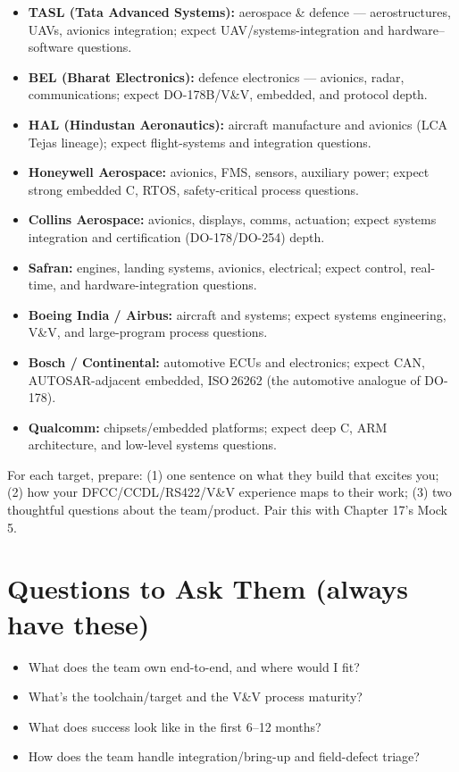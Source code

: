 \begin{itemize}
\item \textbf{TASL (Tata Advanced Systems):} aerospace \& defence --- aerostructures,
  UAVs, avionics integration; expect UAV/systems-integration and
  hardware--software questions.
\item \textbf{BEL (Bharat Electronics):} defence electronics --- avionics, radar,
  communications; expect DO-178B/V\&V, embedded, and protocol depth.
\item \textbf{HAL (Hindustan Aeronautics):} aircraft manufacture and avionics
  (LCA Tejas lineage); expect flight-systems and integration questions.
\item \textbf{Honeywell Aerospace:} avionics, FMS, sensors, auxiliary power;
  expect strong embedded C, RTOS, safety-critical process questions.
\item \textbf{Collins Aerospace:} avionics, displays, comms, actuation; expect
  systems integration and certification (DO-178/DO-254) depth.
\item \textbf{Safran:} engines, landing systems, avionics, electrical; expect
  control, real-time, and hardware-integration questions.
\item \textbf{Boeing India / Airbus:} aircraft and systems; expect systems
  engineering, V\&V, and large-program process questions.
\item \textbf{Bosch / Continental:} automotive ECUs and electronics; expect CAN,
  AUTOSAR-adjacent embedded, ISO\,26262 (the automotive analogue of DO-178).
\item \textbf{Qualcomm:} chipsets/embedded platforms; expect deep C, ARM
  architecture, and low-level systems questions.
\end{itemize}

\begin{partnote}
For each target, prepare: (1) one sentence on what they build that excites you;
(2) how your DFCC/CCDL/RS422/V\&V experience maps to their work; (3) two
thoughtful questions about the team/product. Pair this with Chapter 17's Mock 5.
\end{partnote}

\section{Questions to Ask Them (always have these)}
\begin{itemize}
\item What does the team own end-to-end, and where would I fit?
\item What's the toolchain/target and the V\&V process maturity?
\item What does success look like in the first 6--12 months?
\item How does the team handle integration/bring-up and field-defect triage?
\end{itemize}

